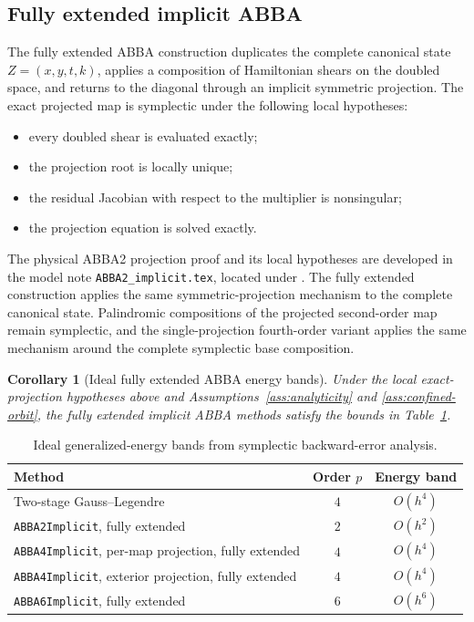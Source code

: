 \documentclass[11pt,a4paper]{article}
\newtheorem{corollary}[theorem]{Corollary}
\theoremstyle{definition}
\theoremstyle{remark}
\begin{document}
\subsection{Fully extended implicit ABBA}

The fully extended ABBA construction duplicates the complete canonical state
$Z=(x,y,t,k)$, applies a composition of Hamiltonian shears on the doubled
space, and returns to the diagonal through an implicit symmetric projection.
The exact projected map is symplectic under the following local hypotheses:
\begin{itemize}
 \item every doubled shear is evaluated exactly;
 \item the projection root is locally unique;
 \item the residual Jacobian with respect to the multiplier is nonsingular;
 \item the projection equation is solved exactly.
\end{itemize}
The physical ABBA2 projection proof and its local hypotheses are developed in
the model note \texttt{ABBA2\_implicit.tex}, located under
.  The fully extended construction applies
the same symmetric-projection mechanism to the complete canonical state.
Palindromic compositions of the projected second-order map remain symplectic,
and the single-projection fourth-order variant applies the same mechanism
around the complete symplectic base composition.

\begin{corollary}[Ideal fully extended ABBA energy bands]
\label{cor:abba-energy-bands}
Under the local exact-projection hypotheses above and
Assumptions~\ref{ass:analyticity} and \ref{ass:confined-orbit}, the fully
extended implicit ABBA methods satisfy the bounds in Table~\ref{tab:energy-bands}.
\end{corollary}

\begin{table}[ht]
 \centering
 \caption{Ideal generalized-energy bands from symplectic backward-error analysis.}
 \label{tab:energy-bands}
 \begin{tabular}{@{}lcc@{}}
  \toprule
  Method & Order $p$ & Energy band \\
  \midrule
  Two-stage Gauss--Legendre & $4$ & $O(h^4)$ \\
  \texttt{ABBA2Implicit}, fully extended & $2$ & $O(h^2)$ \\
  \texttt{ABBA4Implicit}, per-map projection, fully extended & $4$ & $O(h^4)$ \\
  \texttt{ABBA4Implicit}, exterior projection, fully extended & $4$ & $O(h^4)$ \\
  \texttt{ABBA6Implicit}, fully extended & $6$ & $O(h^6)$ \\
  \bottomrule
 \end{tabular}
\end{table}
\end{document}

